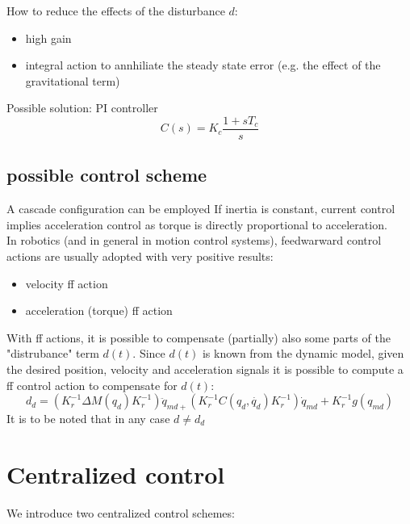 \documentclass{book}
\begin{document}
How to reduce the effects of the disturbance $d$:
\begin{itemize}
    \item high gain
    \item integral action to annhiliate the steady state error (e.g. the effect of the gravitational term)
\end{itemize}
Possible solution: PI controller
\[
    C(s)=  K_c\frac{1+sT_c}{s}
\]
\subsection{possible control scheme}
A cascade configuration can be employed
If inertia is constant, current control implies acceleration control as torque is directly proportional to acceleration.\\
In robotics (and in general in motion control systems), feedwarward control actions are usually adopted with very positive results: 
\begin{itemize}
    \item velocity ff action
    \item acceleration (torque) ff action
\end{itemize}
With ff actions, it is possible to compensate (partially) also some parts of the "distrubance" term $d(t)$. Since $d(t)$ is known from the dynamic model, given the desired position, velocity and acceleration signals it is possible to compute a ff control action to compensate for $d(t)$:
\[
    d_d=(K_r^{-1}\Delta M(q_d)K_r^{-1})\ddot{q}_{md+}(K_r^{-1}C(q_d,\dot{q_d})K_r^{-1})\dot{q}_{md}+K_r^{-1}g(q_{md})
\]
It is to be noted that in any case $d\neq d_d$

\section{Centralized control}
We introduce two centralized control schemes:
\end{document}
